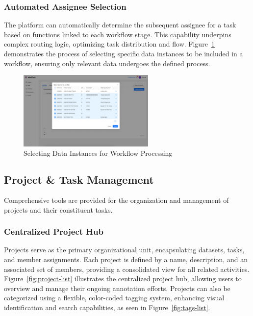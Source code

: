 \subsubsection{Automated Assignee Selection}
The platform can automatically determine the subsequent assignee for a task based on functions linked to each workflow stage. This capability underpins complex routing logic, optimizing task distribution and flow. Figure~\ref{fig:workflow-select-data} demonstrates the process of selecting specific data instances to be included in a workflow, ensuring only relevant data undergoes the defined process.

\begin{figure}[h!]
    \centering
    \includegraphics[width=0.6\textwidth]{content/resources/features/choose dataset.png}
    \caption{Selecting Data Instances for Workflow Processing}
    \label{fig:workflow-select-data}
\end{figure}

\subsection{Project \& Task Management}
Comprehensive tools are provided for the organization and management of projects and their constituent tasks.

\subsubsection{Centralized Project Hub}
Projects serve as the primary organizational unit, encapsulating datasets, tasks, and member assignments. Each project is defined by a name, description, and an associated set of members, providing a consolidated view for all related activities. Figure~\ref{fig:project-list} illustrates the centralized project hub, allowing users to overview and manage their ongoing annotation efforts. Projects can also be categorized using a flexible, color-coded tagging system, enhancing visual identification and search capabilities, as seen in Figure~\ref{fig:tags-list}.

